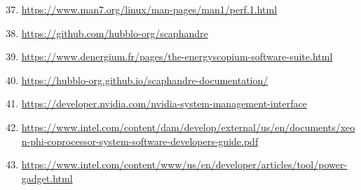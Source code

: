 \begin{enumerate}[label={\normalfont \textbf{(L\arabic*)}}] 
\setcounter{enumi}{36} 
 \item \label{link-c-Perf} \url{https://www.man7.org/linux/man-pages/man1/perf.1.html}
 \item \label{link-c-Scaphandre} \url{https://github.com/hubblo-org/scaphandre}
 \item \label{link-d-Energy-Scopium} \url{https://www.denergium.fr/pages/the-energyscopium-software-suite.html}
 \item \label{link-d-Scaphandre} \url{https://hubblo-org.github.io/scaphandre-documentation/}
 \item \label{link-d-NVML} \url{https://developer.nvidia.com/nvidia-system-management-interface}
 \item \label{link-d-Intel-SMC} \url{https://www.intel.com/content/dam/develop/external/us/en/documents/xeon-phi-coprocessor-system-software-developers-guide.pdf}
 \item \label{link-d-Intel-Power-Gadget} \url{https://www.intel.com/content/www/us/en/developer/articles/tool/power-gadget.html}
\end{enumerate}